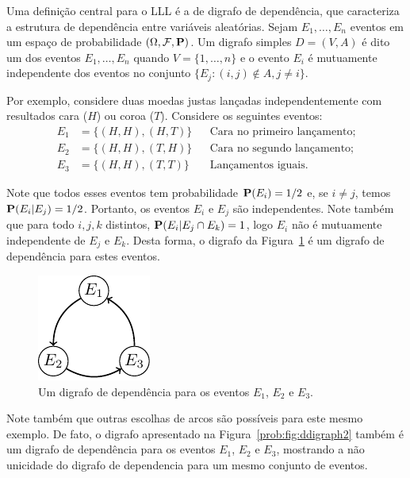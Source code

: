 Uma definição central para o LLL é a de digrafo de dependência, que caracteriza a estrutura de dependência entre variáveis aleatórias. Sejam $E_1, \dots, E_n$ eventos em um espaço de probabilidade $(\Omega, \mathcal{F}, \operatorname{\mathbf{P}})$. Um digrafo simples $D = (V,A)$ é dito um  dos eventos $E_1, \dots, E_n$ quando $V = \{1, \dots, n\}$ e o evento $E_i$ é mutuamente independente dos eventos no conjunto $\{ E_j : (i,j) \not\in A, j \neq i\}$.

Por exemplo, considere duas moedas justas lançadas independentemente com resultados cara ($H$) ou coroa ($T$). Considere os seguintes eventos:
\begin{align*}
  E_1 &= \{ (H,H) , (H,T) \} && \text{Cara no primeiro lançamento;}\\
  E_2 &= \{ (H,H) , (T,H) \} && \text{Cara no segundo lançamento;}\\
  E_3 &= \{ (H,H) , (T,T) \} && \text{Lançamentos iguais.}
\end{align*}

Note que todos esses eventos tem probabilidade $\operatorname{\mathbf{P}}(E_i) = 1/2$ e, se $i \neq j$, temos $\operatorname{\mathbf{P}}(E_i | E_j) = 1/2$. Portanto, os eventos $E_i$ e $E_j$ são independentes. Note também que para todo $i,j,k$ distintos, $\operatorname{\mathbf{P}}(E_i | E_j \cap E_k) = 1$, logo $E_i$ não é mutuamente independente de $E_j$ e $E_k$. Desta forma, o digrafo da Figura~\ref{prob:fig:ddigraph} é um digrafo de dependência para estes eventos.

\begin{figure}[ht!]
\centering
\includegraphics{figures/4_prob_1_ddigraph}
\caption{Um digrafo de dependência para os eventos $E_1$, $E_2$ e $E_3$.}
\label{prob:fig:ddigraph}
\end{figure}

Note também que outras escolhas de arcos são possíveis para este mesmo exemplo. De fato, o digrafo apresentado na Figura~\ref{prob:fig:ddigraph2} também é um digrafo de dependência para os eventos $E_1$, $E_2$ e $E_3$, mostrando a não unicidade do digrafo de dependencia para um mesmo conjunto de eventos.

